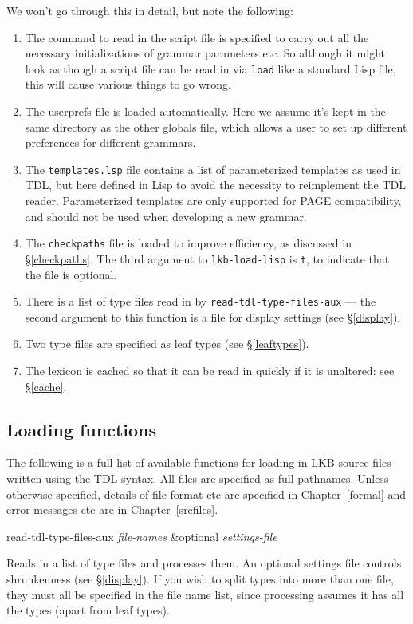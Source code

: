 \documentclass[12pt]{report}
\newcommand{\lispcommand}[1]{\noindent\rm #1}%
\begin{document}
We won't go through this in detail, but
note the following:
\begin{enumerate}
\item The command to read in the script file is specified
to carry out all the necessary initializations of grammar parameters
etc.  So although it might look as though a script file can
be read in via {\tt load} like a standard Lisp file, this will
cause various things to go wrong.
\item The userprefs file is loaded automatically.  Here we assume it's
kept in the same directory as the other globals file, which allows
a user to set up different preferences for different grammars.
\item The {\tt templates.lsp} file contains a list of 
parameterized templates as used in TDL, but here defined in Lisp
to avoid the necessity to reimplement the TDL reader.
Parameterized templates are only supported for PAGE compatibility,
and should not be used when developing a new grammar.
\item The {\tt checkpaths} file is loaded to improve efficiency,
as discussed in \S\ref{checkpaths}.  The third argument to 
{\tt lkb-load-lisp} is {\tt t}, to indicate that the file is optional.
\item There is a list of type files read in by {\tt read-tdl-type-files-aux}
--- the second argument to this function is a file for
display settings (see \S\ref{display}).
\item Two type files are specified as leaf types (see \S\ref{leaftypes}).
\item The lexicon is cached so that it can be read in quickly if it is
unaltered: see \S\ref{cache}.
\end{enumerate}

\subsection{Loading functions}
\label{loadfns}

The following is a full list of available functions for loading
in LKB source files written using the TDL syntax.  All files
are specified as full pathnames.  Unless otherwise
specified, details of file format etc are 
specified in Chapter~\ref{formal} and error messages
etc are in Chapter~\ref{srcfiles}.

\lispcommand{read-tdl-type-files-aux {\it file-names} \&optional 
{\it settings-file}}

Reads in a list of type files and processes
them.  An optional settings file 
controls shrunkenness (see \S\ref{display}).
If you wish to split types into more than one file, they 
must all be specified in the file name list, since processing 
assumes it has all the types (apart from leaf types).
\end{document}
